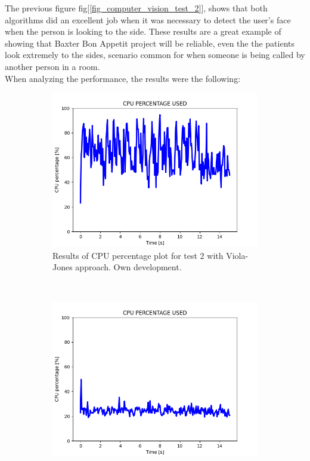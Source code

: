 \documentclass[11pt]{report} %
\begin{document}
The previous figure fig[\ref{fig_computer_vision_test_2}], shows that both algorithms did an excellent job when it was necessary to detect the user's face when the person is looking to the side. These results are a great example of showing that Baxter Bon Appetit project will be reliable, even the the patients look extremely to the sides, scenario common for when someone is being called by another person in a room.\\

When analyzing the performance, the results were the following:

\begin{figure}[H]
	\centering
	\begin{subfigure}{.5\textwidth}
		\centering
		\includegraphics[width=1.0\linewidth]{assets/imgs/computer_vision/face_detection_ex_2_hc_cpu.png}
		\caption{Results of CPU percentage plot for test 2 with Viola-Jones approach. Own development.}
		\label{fig_computer_vision_test_2_cpu_a}
	\end{subfigure}~
	\begin{subfigure}{.5\textwidth}
		\centering
		\includegraphics[width=1.0\linewidth]{assets/imgs/computer_vision/face_detection_ex_2_fr_cpu.png}

\end{subfigure}
\end{figure}
\end{document}
